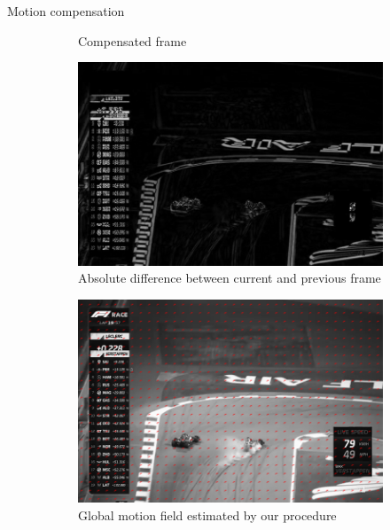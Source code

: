 \documentclass[aspectratio=1610,xcolor=dvipsnames]{beamer}
\begin{document}
\begin{frame}{Motion compensation}
\begin{figure}[htbp]
\begin{subfigure}[b]{0.3\textwidth}
            \caption{Compensated frame}
            \label{fig:race-compensated}
        \end{subfigure}
        
        \begin{subfigure}[b]{0.3\textwidth}
            \centering
            \includegraphics[width=.9\textwidth]{images/race-curr_prev_diff.png}
            \caption{Absolute difference between current and previous frame}
            \label{fig:race-diff-curr-prev}
        \end{subfigure}
        \hfill
        \begin{subfigure}[b]{0.3\textwidth}
            \includegraphics[width=.9\textwidth]{images/race-model_motion_field.png}
            \caption{Global motion field estimated by our procedure}
            \label{fig:race-est-mf}
        \end{subfigure}
        \hfill
        \begin{subfigure}[b]{0.3\textwidth}

\end{subfigure}
\end{figure}
\end{frame}
\end{document}

